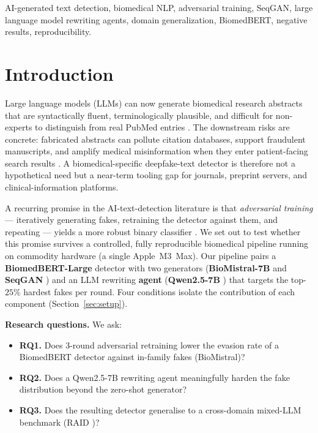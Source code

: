 \documentclass[conference]{IEEEtran}
\begin{document}
\begin{IEEEkeywords}
AI-generated text detection, biomedical NLP, adversarial training,
SeqGAN, large language model rewriting agents, domain generalization,
BiomedBERT, negative results, reproducibility.
\end{IEEEkeywords}

\section{Introduction}
\label{sec:introduction}

Large language models (LLMs) can now generate biomedical research abstracts
that are syntactically fluent, terminologically plausible, and difficult for
non-experts to distinguish from real PubMed entries
\cite{else2023chatgpt,liang2023gptdetect}. The downstream risks are concrete:
fabricated abstracts can pollute citation databases, support fraudulent
manuscripts, and amplify medical misinformation when they enter
patient-facing search results \cite{majovsky2023artificialintelligence}. A
biomedical-specific deepfake-text detector is therefore not a hypothetical
need but a near-term tooling gap for journals, preprint servers, and
clinical-information platforms.

A recurring promise in the AI-text-detection literature is that
\emph{adversarial training} — iteratively generating fakes, retraining the
detector against them, and repeating — yields a more robust binary
classifier \cite{zellers2019defending,gehrmann2019gltr,
mitchell2023detectgpt}. We set out to test whether this promise survives a
controlled, fully reproducible biomedical pipeline running on commodity
hardware (a single Apple~M3~Max). Our pipeline pairs a
\textbf{BiomedBERT-Large} detector \cite{gu2021biomedbert} with two
generators (\textbf{BioMistral-7B} \cite{labrak2024biomistral} and
\textbf{SeqGAN} \cite{yu2017seqgan}) and an LLM rewriting
\textbf{agent} (\textbf{Qwen2.5-7B} \cite{qwen2024technical}) that targets
the top-\(25\%\) hardest fakes per round. Four conditions isolate the
contribution of each component (Section~\ref{sec:setup}).

\textbf{Research questions.} We ask:
\begin{itemize}
\item \textbf{RQ1.} Does 3-round adversarial retraining lower the evasion
  rate of a BiomedBERT detector against in-family fakes
  (BioMistral)?
\item \textbf{RQ2.} Does a Qwen2.5-7B rewriting agent meaningfully harden
  the fake distribution beyond the zero-shot generator?
\item \textbf{RQ3.} Does the resulting detector generalise to a
  cross-domain mixed-LLM benchmark (RAID \cite{dugan2024raid})?
\end{itemize}
\end{document}
